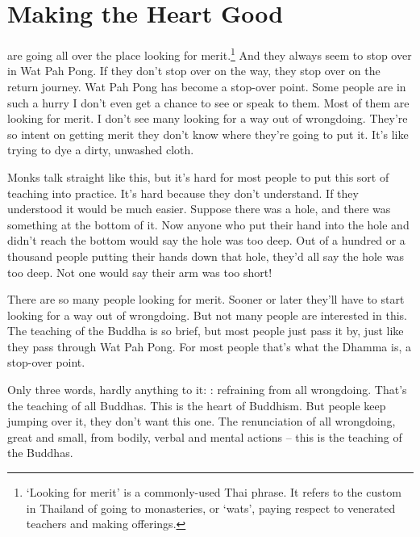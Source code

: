 
\chapter{Making the Heart Good}

 are going all over the place looking for merit.\footnote{`Looking for merit' is a commonly-used Thai phrase. It refers to the custom in Thailand of going to monasteries, or `wats', paying respect to venerated teachers and making offerings.} And they always seem to stop over in Wat Pah Pong. If they don't stop over on the way, they stop over on the return journey. Wat Pah Pong has become a stop-over point. Some people are in such a hurry I don't even get a chance to see or speak to them. Most of them are looking for merit. I don't see many looking for a way out of wrongdoing. They're so intent on getting merit they don't know where they're going to put it. It's like trying to dye a dirty, unwashed cloth. 

Monks talk straight like this, but it's hard for most people to put this sort of teaching into practice. It's hard because they don't understand. If they understood it would be much easier. Suppose there was a hole, and there was something at the bottom of it. Now anyone who put their hand into the hole and didn't reach the bottom would say the hole was too deep. Out of a hundred or a thousand people putting their hands down that hole, they'd all say the hole was too deep. Not one would say their arm was too short! 

There are so many people looking for merit. Sooner or later they'll have to start looking for a way out of wrongdoing. But not many people are interested in this. The teaching of the Buddha is so brief, but most people just pass it by, just like they pass through Wat Pah Pong. For most people that's what the Dhamma is, a stop-over point. 

Only three words, hardly anything to it: : refraining from all wrongdoing. That's the teaching of all Buddhas. This is the heart of Buddhism. But people keep jumping over it, they don't want this one. The renunciation of all wrongdoing, great and small, from bodily, verbal and mental actions -- this is the teaching of the Buddhas. 

